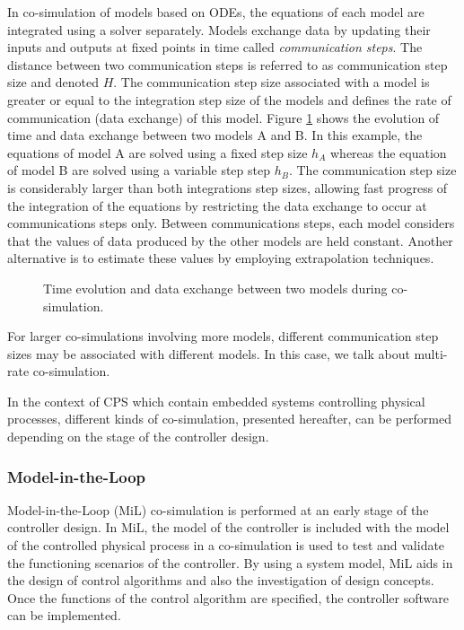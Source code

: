 In co-simulation of models based on ODEs, the equations of each model are integrated using a solver separately. Models exchange data by updating their inputs and outputs at fixed points in time called \textit{communication steps}. The distance between two communication steps is referred to as communication step size and denoted $H$. The communication step size associated with a model is greater or equal to the integration step size of the models and defines the rate of communication (data exchange) of this model. Figure \ref{fig:cosim} shows the evolution of time and data exchange between two models A and B. In this example, the equations of model A are solved using a fixed step size $h_A$ whereas the equation of model B are solved using a variable step step $h_B$. The communication step size is considerably larger than both integrations step sizes, allowing fast progress of the integration of the equations by restricting the data exchange to occur at communications steps only. Between communications steps, each model considers that the values of data produced by the other models are held constant. Another alternative is to estimate these values by employing extrapolation techniques.

\begin{figure}[phbt]
\centering

\caption{Time evolution and data exchange between two models during co-simulation.}
\label{fig:cosim}
\end{figure}

For larger co-simulations involving more models, different communication step sizes may be associated with different models. In this case, we talk about multi-rate co-simulation.

In the context of CPS which contain embedded systems controlling physical processes, different kinds of co-simulation, presented hereafter, can be performed depending on the stage of the controller design.

\subsubsection{Model-in-the-Loop}

Model-in-the-Loop (MiL) co-simulation is performed at an early stage of the controller design. In MiL, the model of the controller is included with the model of the controlled physical process in a co-simulation is used to test and validate the functioning scenarios of the controller. By using a system model, MiL aids in the design of control algorithms and also the investigation of design concepts. Once the functions of the control algorithm are specified, the controller software can be implemented.

